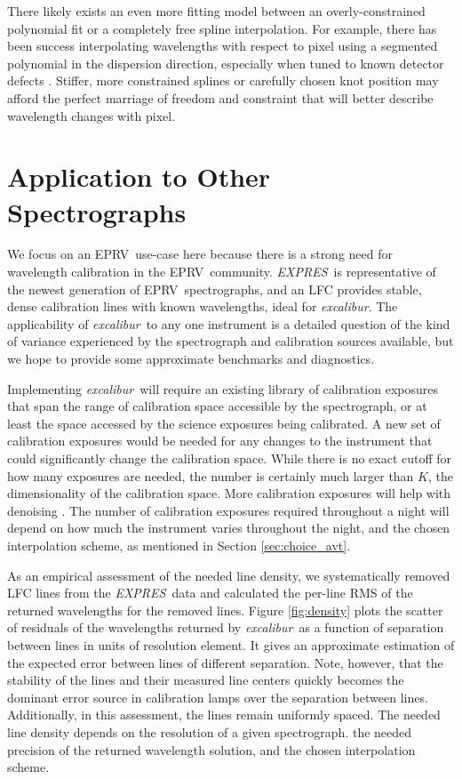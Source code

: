 \documentclass[modern]{aastex63}
\newcommand{\project}[1]{\textsl{#1}}
\newcommand{\name}{\project{excalibur}}
\newcommand{\acronym}[1]{{\small{#1}}}
\newcommand{\expres}{\project{\acronym{EXPRES}}}
\newcommand{\eprv}{\acronym{EPRV}}
\begin{document}
There likely exists an even more fitting model between an overly-constrained polynomial fit or a completely free spline interpolation.  For example, there has been success interpolating wavelengths with respect to pixel using a segmented polynomial in the dispersion direction, especially when tuned to known detector defects \citep{milakovic2020}.  Stiffer, more constrained splines or carefully chosen knot position may afford the perfect marriage of freedom and constraint that will better describe wavelength changes with pixel.


\section{Application to Other Spectrographs}
\label{sec:others}
We focus on an \eprv\ use-case here because there is a strong need for wavelength calibration in the \eprv\ community.  \expres\ is representative of the newest generation of \eprv\ spectrographs, and an LFC provides stable, dense calibration lines with known wavelengths, ideal for \name.  The applicability of \name\ to any one instrument is a detailed question of the kind of variance experienced by the spectrograph and calibration sources available, but we hope to provide some approximate benchmarks and diagnostics.

Implementing \name\ will require an existing library of calibration exposures that span the range of calibration space accessible by the spectrograph, or at least the space accessed by the science exposures being calibrated.  A new set of calibration exposures would be needed for any changes to the instrument that could significantly change the calibration space.  While there is no exact cutoff for how many exposures are needed, the number is certainly much larger than $K$, the dimensionality of the calibration space.  More calibration exposures will help with denoising .  The number of calibration exposures required throughout a night will depend on how much the instrument varies throughout the night, and the chosen interpolation scheme, as mentioned in Section \ref{sec:choice_avt}.

As an empirical assessment of the needed line density, we systematically removed LFC lines from the \expres\ data and calculated the per-line RMS of the returned wavelengths for the removed lines.  Figure \ref{fig:density} plots the scatter of residuals of the wavelengths returned by \name\ as a function of separation between lines in units of resolution element.  It gives an approximate estimation of the expected error between lines of different separation.  Note, however, that the stability of the lines and their measured line centers quickly becomes the dominant error source in calibration lamps over the separation between lines.  Additionally, in this assessment, the lines remain uniformly spaced.  The needed line density depends on the resolution of a given spectrograph. the needed precision of the returned wavelength solution, and the chosen interpolation scheme.
\end{document}
